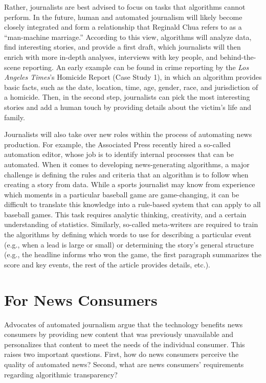 \documentclass[notoc, symmetric, nobib, nols]{towcenter-guideto-book}
\begin{document}
Rather, journalists are best advised to focus on tasks that algorithms cannot perform. In the future, human and automated journalism will likely become closely integrated and form a relationship that Reginald Chua refers to as a ``man-machine marriage.'' According to this view, algorithms will analyze data, find interesting stories, and provide a first draft, which journalists will then enrich with more in-depth analyses, interviews with key people, and behind-the-scene reporting. An early example can be found in crime reporting by the \textit{Los Angeles Times}'s Homicide Report (Case Study 1), in which an algorithm provides basic facts, such as the date, location, time, age, gender, race, and jurisdiction of a homicide. Then, in the second step, journalists can pick the most interesting stories and add a human touch by providing details about the victim's life and family.\autocite{young15} 

Journalists will also take over new roles within the process of automating news production. For example, the Associated Press recently hired a so-called automation editor, whose job is to identify internal processes that can be automated. When it comes to developing news-generating algorithms, a major challenge is defining the rules and criteria that an algorithm is to follow when creating a story from data. While a sports journalist may know from experience which moments in a particular baseball game are game-changing, it can be difficult to translate this knowledge into a rule-based system that can apply to all baseball games. This task requires analytic thinking, creativity, and a certain understanding of statistics. Similarly, so-called meta-writers are required to train the algorithms by defining which words to use for describing a particular event (e.g., when a lead is large or small) or determining the story's general structure (e.g., the headline informs who won the game, the first paragraph summarizes the score and key events, the rest of the article provides details, etc.).

\section{For News Consumers}

Advocates of automated journalism argue that the technology benefits news consumers by providing new content that was previously unavailable and personalizes that content to meet the needs of the individual consumer. This raises two important questions. First, how do news consumers perceive the quality of automated news? Second, what are news consumers' requirements regarding algorithmic transparency?
 
\end{document}
